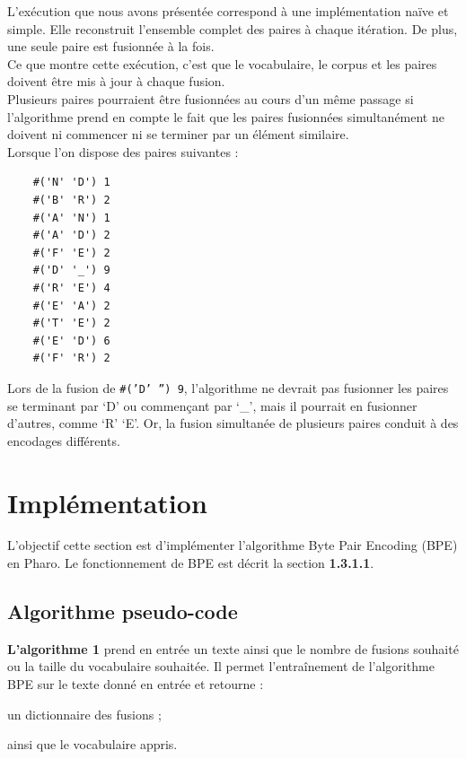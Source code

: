 \documentclass[12pt,a4paper]{report}
\begin{document}
L’exécution que nous avons présentée correspond à une implémentation naïve et simple. Elle reconstruit l’ensemble complet des paires à chaque itération. De plus, une seule paire est fusionnée à la fois.\\
Ce que montre cette exécution, c’est que le vocabulaire, le corpus et les paires doivent être mis à jour à chaque fusion.\\
Plusieurs paires pourraient être fusionnées au cours d’un même passage si l’algorithme prend en compte le fait que les paires fusionnées simultanément ne doivent ni commencer ni se terminer par un élément similaire.\\
Lorsque l’on dispose des paires suivantes :

\begin{verbatim}
	#('N' 'D') 1
	#('B' 'R') 2
	#('A' 'N') 1
	#('A' 'D') 2
	#('F' 'E') 2
	#('D' '_') 9
	#('R' 'E') 4
	#('E' 'A') 2
	#('T' 'E') 2
	#('E' 'D') 6
	#('F' 'R') 2
\end{verbatim}

Lors de la fusion de \texttt{\#('D' '') 9}, l’algorithme ne devrait pas fusionner les paires se terminant par ‘D’ ou commençant par ‘\_’, mais il pourrait en fusionner d’autres, comme ‘R’ ‘E’. Or, la fusion simultanée de plusieurs paires conduit à des encodages différents.

\section{Implémentation}

L'objectif cette section est d'implémenter l'algorithme Byte Pair Encoding (BPE) en Pharo.
Le fonctionnement de BPE est décrit la section \textbf{1.3.1.1}.

\subsection{Algorithme pseudo-code}

\textbf{L’algorithme 1} prend en entrée un texte ainsi que le nombre de fusions souhaité ou la taille du vocabulaire souhaitée. Il permet l’entraînement de l’algorithme BPE sur le texte donné en entrée et retourne :

\begin{itemizeFB}
	\item un dictionnaire des fusions ;
	\item ainsi que le vocabulaire appris.
\end{itemizeFB}
\end{document}
